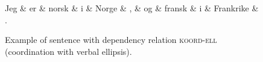 \documentclass[a4paper,12pt,english]{book}
\begin{document}

\begin{figure}
    \begin{dependency}[theme = simple]
        \begin{deptext}[column sep=1em]
            Jeg \& er \& norsk \& i \& Norge \& , \& og \& fransk \& i \& Frankrike
            \& . \\
        \end{deptext}
    \end{dependency}
    \caption{Example of sentence with dependency relation \textsc{koord-ell}
        (coordination with verbal ellipsis).}
    \label{exkoordell}
\end{figure}
\end{document}
